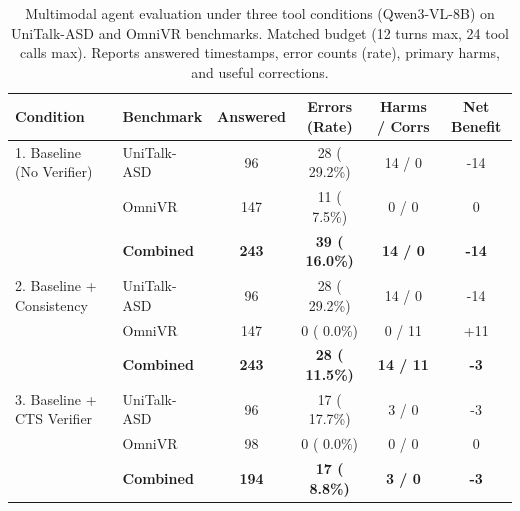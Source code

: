 \begin{table}[t]
\centering\small
\caption{Multimodal agent evaluation under three tool conditions (Qwen3-VL-8B) on UniTalk-ASD and OmniVR benchmarks. Matched budget (12 turns max, 24 tool calls max). Reports answered timestamps, error counts (rate), primary harms, and useful corrections.}
\label{tab:toolconditions_active}
\setlength{\tabcolsep}{6pt}
\begin{tabular}{@{}llcccc@{}}
\toprule
Condition & Benchmark & Answered & Errors (Rate) & Harms / Corrs & Net Benefit \\
\midrule
1. Baseline (No Verifier)      & UniTalk-ASD  &  96 & 28 ( 29.2\%) & 14 /  0 &  -14 \\
                               & OmniVR       & 147 & 11 (  7.5\%) &  0 /  0 &    0 \\
                               & \textbf{Combined}   & \textbf{243} & \textbf{39 ( 16.0\%)} & \textbf{14 /  0} & \textbf{ -14} \\
\midrule
2. Baseline + Consistency      & UniTalk-ASD  &  96 & 28 ( 29.2\%) & 14 /  0 &  -14 \\
                               & OmniVR       & 147 &  0 (  0.0\%) &  0 / 11 &  +11 \\
                               & \textbf{Combined}   & \textbf{243} & \textbf{28 ( 11.5\%)} & \textbf{14 / 11} & \textbf{  -3} \\
\midrule
3. Baseline + CTS Verifier     & UniTalk-ASD  &  96 & 17 ( 17.7\%) &  3 /  0 &   -3 \\
                               & OmniVR       &  98 &  0 (  0.0\%) &  0 /  0 &    0 \\
                               & \textbf{Combined}   & \textbf{194} & \textbf{17 (  8.8\%)} & \textbf{ 3 /  0} & \textbf{  -3} \\
\bottomrule
\end{tabular}
\end{table}


